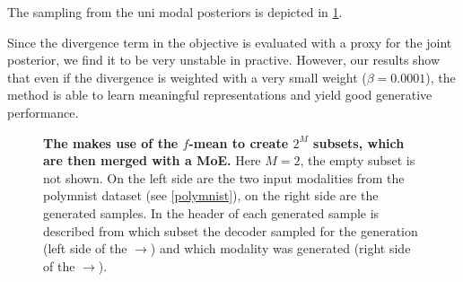The sampling from the uni modal posteriors is depicted in \cref{iwmogfmGraph}.

\smallskip

Since the divergence term in the objective is evaluated with a proxy for the joint posterior, we find it to be very unstable in practive.
However, our results show that even if the divergence is weighted with a very small weight ($\beta = 0.0001$), the  method is able to learn meaningful representations and yield good generative performance.

\begin{figure}[h!]
    \centering
    \caption{\textbf{The  makes use of the $f$-mean to create $2^M$ subsets, which are then merged with a MoE.} Here $M=2$, the empty subset is not shown. On the left side are the two input modalities from the polymnist dataset (see \cref{polymnist}), on the right side are the generated samples. In the header of each generated sample is described from which subset the decoder sampled for the generation (left side of the $\rightarrow$) and which modality was generated (right side of the $\rightarrow$).}
    \label{iwmogfmGraph}
\end{figure}



